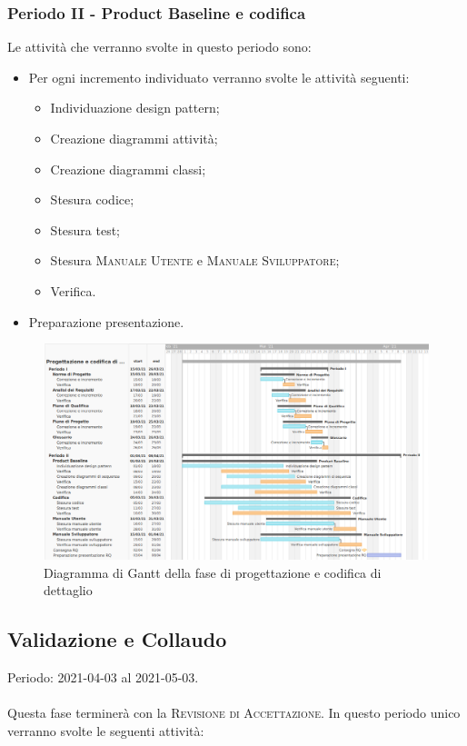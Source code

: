 \documentclass[../piano_di_progetto.tex]{subfiles}
\begin{document}
\subsubsection{Periodo II - Product Baseline e codifica}
Le attività che verranno svolte in questo periodo sono:
\begin{itemize}
    \item Per ogni incremento individuato verranno svolte le attività seguenti: 
    \begin{itemize}
        \item Individuazione design pattern;
        \item Creazione diagrammi attività;
        \item Creazione diagrammi classi;
        \item Stesura codice;
        \item Stesura test;
        \item Stesura \textsc{Manuale Utente} e \textsc{Manuale Sviluppatore};
        \item Verifica.
    \end{itemize}
    \item Preparazione presentazione.
\end{itemize}

\begin{figure}[H]
\centering
\includegraphics[width=18cm]{src/img/gantt/03_RQ_alternative_2.png}
\caption{Diagramma di Gantt della fase di progettazione e codifica di dettaglio}
\end{figure}

\subsection{Validazione e Collaudo}%
\label{sub:valid_coll}
Periodo: 2021-04-03 al 2021-05-03.\\ \\ 
Questa fase terminerà con la \textsc{Revisione di Accettazione}. In questo periodo unico verranno svolte le seguenti attività:
\end{document}
